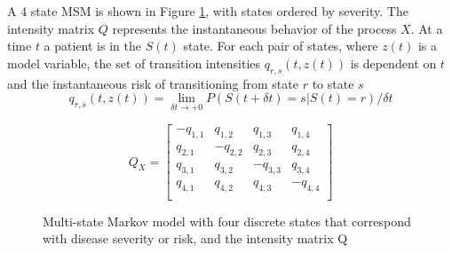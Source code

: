 A 4 state MSM is shown in Figure \ref{fig:msm}, with states ordered by severity.  The intensity matrix $Q$ represents the instantaneous behavior of the process $X$.  At a time $t$ a patient is in the $S(t)$ state.  For each pair of states, where $z(t)$ is a model variable, the set of transition intensities $q_{r,s}(t,z(t))$ is dependent on $t$ and the instantaneous risk of transitioning from state $r$ to state $s$
$$q_{r,s}(t,z(t)) =  \lim_{\delta t \to +0} P(S(t+\delta t ) = s | S(t) = r) / \delta t $$


\begin{figure}[h!]
\begin{center}
\[
Q_X =
  \begin{bmatrix}
    -q_{1,1} & q_{1,2} & q_{1,3} & q_{1,4}\\
    q_{2,1} & -q_{2,2} & q_{2,3} & q_{2,4}\\
    q_{3,1} & q_{3,2} & -q_{3,3} & q_{3,4}\\
    q_{4,1} & q_{4,2} & q_{4,3} & -q_{4,4}\\
  \end{bmatrix}
\]
\end{center}
\caption{Multi-state Markov model with four discrete states that correspond with disease severity or risk, and the intensity matrix Q}
\label{fig:msm}
\end{figure}

